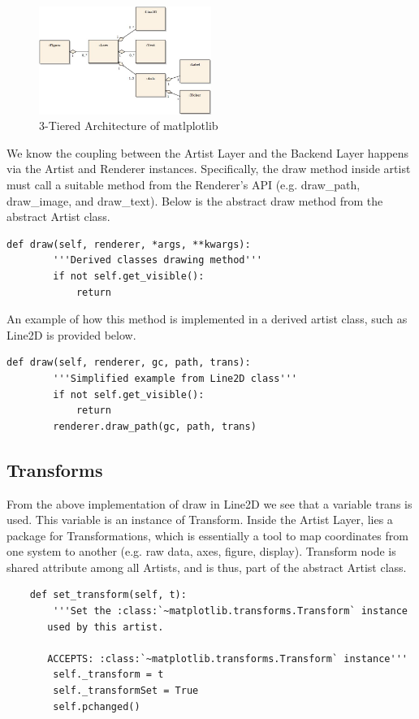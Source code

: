 \documentclass[pdftex,10pt,a4paper]{report}
\begin{document}
\begin{figure}[ht!]
        \centering
                \includegraphics[width=0.5\textwidth]{img/umls/arch/artistExAgg}
        \caption{3-Tiered Architecture of matlplotlib}\label{fig:artistExAgg}
\end{figure}

We know the coupling between the Artist Layer and the Backend Layer happens via the Artist and Renderer instances. Specifically, the draw method inside artist must call a suitable method from the Renderer's API (e.g. draw\_path, draw\_image, and draw\_text). Below is the abstract draw method from the abstract Artist class.


\begin{lstlisting}
def draw(self, renderer, *args, **kwargs):
        '''Derived classes drawing method'''
        if not self.get_visible():
            return
\end{lstlisting}

An example of how this method is implemented in a derived artist class, such as Line2D is provided below.

\begin{lstlisting}
def draw(self, renderer, gc, path, trans):
        '''Simplified example from Line2D class'''
        if not self.get_visible():
            return
        renderer.draw_path(gc, path, trans)
\end{lstlisting}

\subsection{Transforms}

From the above implementation of draw in Line2D we see that a variable trans is used. This variable is an instance of Transform. Inside the Artist Layer, lies a package for Transformations, which is essentially a tool to map coordinates from one system to another (e.g. raw data, axes, figure, display). Transform node is shared attribute among all Artists, and is thus, part of the abstract Artist class. 
\begin{lstlisting}
    def set_transform(self, t):
        '''Set the :class:`~matplotlib.transforms.Transform` instance
       used by this artist.

       ACCEPTS: :class:`~matplotlib.transforms.Transform` instance'''
        self._transform = t
        self._transformSet = True
        self.pchanged()
\end{lstlisting}
\end{document}

